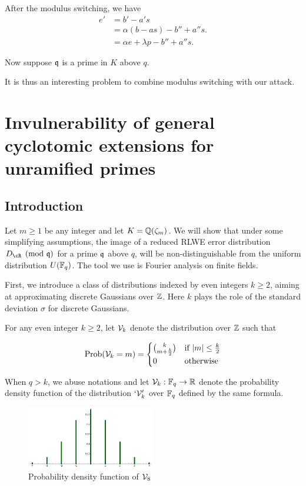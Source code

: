 \documentclass{amsart}
\begin{document}
After the modulus switching, we have
\begin{align*}
    e' &= b' - a's  \\
    &= \alpha(b-as) - b''  + a''s. \\
    & = \alpha e + \lambda p - b'' + a''s.
\end{align*}

Now suppose $\mathfrak{q}$ is a prime in $K$ above $q$.





It is thus an interesting problem to combine modulus switching with our attack.

\section{Invulnerability of general cyclotomic extensions for unramified primes}
\label{sec: cyclo-secure}

\subsection{Introduction}

Let $m \geq 1$ be any integer and let $K = \mathbb{Q}(\zeta_m)$. We will show that under some simplifying assumptions, the image of a reduced RLWE error distribution $D_\cR \pmod{\fq}$ for a prime $\mathfrak{q}$ above $q$, will be non-distinguishable from the uniform distribution $U(\mathbb{F}_q)$. The tool we use is Fourier analysis on finite fields.

First, we introduce a class of distributions indexed by even integers $k \geq 2$, aiming at approximating discrete Gaussians over $\mathbb{Z}$. Here $k$ plays the role of
the standard deviation $\sigma$ for discrete Gaussians.
\begin{Definition}
For any even integer $k \geq 2$, let $\mathcal{V}_k$ denote the distribution over $\mathbb{Z}$ such that

$$\operatorname{Prob}(\mathcal{V}_k = m) =  \begin{cases} {k}\choose{m+\frac{k}{2}} &\mbox{if } |m| \leq \frac{k}{2} \\
0 & \mbox{otherwise}  \end{cases}$$

\end{Definition}
When $q > k$, we abuse notations and let $\mathcal{V}_k: \mathbb{F}_q \to \mathbb{R}$ denote the probability density function of the distribution $`\mathcal{V}_k'$ over $\mathbb{F}_q$ defined by the same formula.

\begin{figure}[h!]
\centering
\includegraphics[width = 0.5\textwidth]{v8.png}
\caption{Probability density function of $\mathcal{V}_8$}
\end{figure}
\end{document}
